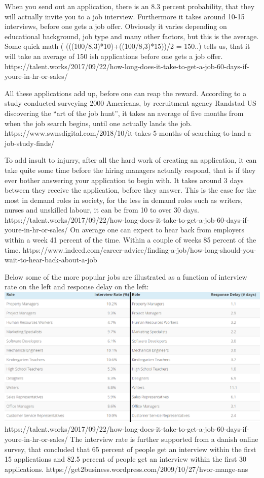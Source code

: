 When you send out an application, there is an 8.3 percent probability, that
they will actually invite you to a job interview. Furthermore it takes around 
10-15 interviews, before one gets a job offer. Obviously it varies depending
on educational background, job type and many other factors, but this is the average.
Some quick math ( (((100/8,3)*10)+((100/8,3)*15))/2 = 150..) tells us, that it will 
take an average of 150 ish applications before one gets a job offer.
https://talent.works/2017/09/22/how-long-does-it-take-to-get-a-job-60-days-if-youre-in-hr-or-sales/

All these applications add up, before one can reap the reward. According to a 
study conducted surveying 2000 Americans, by recruitment agency Randstad US 
discovering the “art of the job hunt”, it takes an average of five
months from when the job search begins, until one actually lands
the job. 
https://www.swnsdigital.com/2018/10/it-takes-5-months-of-searching-to-land-a-job-study-finds/ 

To add insult to injurry, after all the hard work of creating an application, it can 
take quite some time before the hiring managers actually respond, that is if they ever 
bother answering your application to begin with.
It takes around 3 days between they receive the application, before they answer.
This is the case for the most in demand roles in society, for the less in demand roles 
such as writers, nurses and unskilled labour, it can be from 10 to over 30 days.
https://talent.works/2017/09/22/how-long-does-it-take-to-get-a-job-60-days-if-youre-in-hr-or-sales/
On average one can expect to hear back from employers within a week 41 percent
of the time. Within a couple of weeks 85 percent of the time. 
https://www.indeed.com/career-advice/finding-a-job/how-long-should-you-wait-to-hear-back-about-a-job

Below some of the more popular jobs are illustrated as a function of interview 
rate on the left and response delay on the left:  
\includegraphics{figures/interviewratexresponse delay.bmp}
https://talent.works/2017/09/22/how-long-does-it-take-to-get-a-job-60-days-if-youre-in-hr-or-sales/
The interview rate is further supported from a danish online survey, that concluded
that 65 percent of people get an interview within the first 15 applications and
 82.5 percent of people get an interview within the first 30 applications.
 https://get2business.wordpress.com/2009/10/27/hvor-mange-ans%

